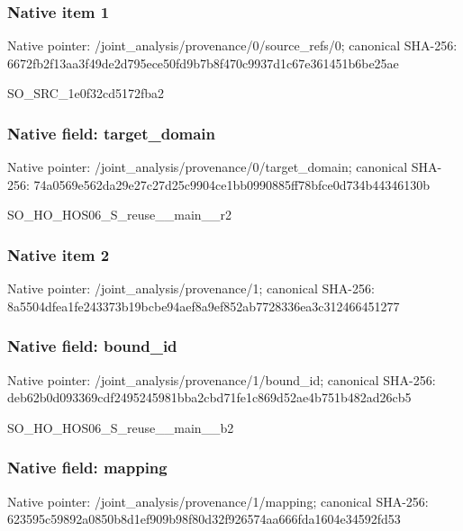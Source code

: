 \documentclass[10pt,a4paper]{article}
\begin{document}
\subsubsection{Native item 1}
Native pointer: /joint\_\allowbreak{}analysis/provenance/0/source\_\allowbreak{}refs/0; canonical SHA-256: 6672fb2f13aa3f49de2d795ece50fd9b7b8f470c9937d1c67e361451b6be25ae

\begingroup\raggedright\sloppy SO\_\allowbreak{}SRC\_\allowbreak{}1e0f32cd5172fba2\par\endgroup

\subsubsection{Native field: target\_\allowbreak{}domain}
Native pointer: /joint\_\allowbreak{}analysis/provenance/0/target\_\allowbreak{}domain; canonical SHA-256: 74a0569e562da29e27c27d25c9904ce1bb0990885ff78bfce0d734b44346130b

\begingroup\raggedright\sloppy SO\_\allowbreak{}HO\_\allowbreak{}HOS06\_\allowbreak{}S\_\allowbreak{}reuse\_\allowbreak{}\_\allowbreak{}main\_\allowbreak{}\_\allowbreak{}r2\par\endgroup

\subsubsection{Native item 2}
Native pointer: /joint\_\allowbreak{}analysis/provenance/1; canonical SHA-256: 8a5504dfea1fe243373b19bcbe94aef8a9ef852ab7728336ea3c312466451277

\subsubsection{Native field: bound\_\allowbreak{}id}
Native pointer: /joint\_\allowbreak{}analysis/provenance/1/bound\_\allowbreak{}id; canonical SHA-256: deb62b0d093369cdf2495245981bba2cbd71fe1c869d52ae4b751b482ad26cb5

\begingroup\raggedright\sloppy SO\_\allowbreak{}HO\_\allowbreak{}HOS06\_\allowbreak{}S\_\allowbreak{}reuse\_\allowbreak{}\_\allowbreak{}main\_\allowbreak{}\_\allowbreak{}b2\par\endgroup

\subsubsection{Native field: mapping}
Native pointer: /joint\_\allowbreak{}analysis/provenance/1/mapping; canonical SHA-256: 623595c59892a0850b8d1ef909b98f80d32f926574aa666fda1604e34592fd53
\end{document}

